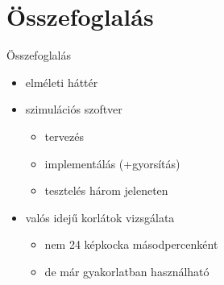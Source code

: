 \section{Összefoglalás}
  \begin{frame}{Összefoglalás}
    \begin{itemize}
      \justifying
      \item elméleti háttér
      \item szimulációs szoftver
      \begin{itemize}
      \item tervezés
      \item implementálás (+gyorsítás)
      \item tesztelés három jeleneten
      \end{itemize}
      \item valós idejű korlátok vizsgálata
      \begin{itemize}
        \item nem 24 képkocka másodpercenként
        \item de már gyakorlatban használható
      \end{itemize}
    \end{itemize}
  \end{frame}
  